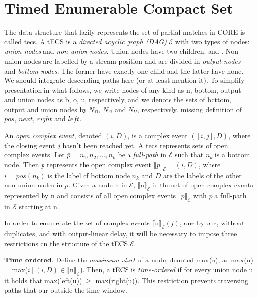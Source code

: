 \section{Timed Enumerable Compact Set}\label{sec:data_structure}

The data structure that lazily represents the set of partial matches in CORE is called \acrfull{tecs}. A tECS is a \emph{directed acyclic graph (DAG)} $\mathcal{E}$ with two types of nodes: \emph{union nodes} and \emph{non-union nodes}. Union nodes have two children:  and . Non-union nodes are labelled by a stream position and are divided in \emph{output nodes} and \emph{bottom nodes}. The former have exactly one child and the latter have none.
{\color{Comment} We should integrate descending-paths here (or at least mention it)}.
To simplify presentation in what follows, we write nodes of any kind as \textrm{n}, bottom, output and union nodes as \textrm{b, o, u}, respectively, and we denote the sets of bottom, output and union nodes by $N_{B}$, $N_{O}$ and $N_{U}$, respectively. {\color{Comment} missing definition of $pos$, $next$, $right$ and $left$}.

An \emph{open complex event}, denoted $(i, D)$, is a complex event $([i, j], D)$, where the closing event $j$ hasn't been reached yet. A \acrshort{tecs} represents sets of open complex events. Let $\bar{p} = n_{1}, n_{2}, \ldots, n_{k}$ be a \emph{full-path} in $\mathcal{E}$ such that $n_{k}$ is a bottom node. Then $\bar{p}$ represents the open complex event ${\llbracket \bar{p} \rrbracket}_{\mathcal{E}} = (i, D)$, where $i = pos(n_{k})$ is the label of bottom node $n_{k}$ and $D$ are the labels of the other non-union nodes in $\bar{p}$. Given a node \textrm{n} in $\mathcal{E}$, ${\llbracket \textrm{n} \rrbracket}_{\mathcal{E}}$ is the set of open complex events represented by \textrm{n} and consists of all open complex events ${\llbracket \bar{p} \rrbracket}_{\mathcal{E}}$ with $\bar{p}$ a full-path in $\mathcal{E}$ starting at \textrm{n}.

In order to enumerate the set of complex events ${\llbracket \textrm{n} \rrbracket}_{\mathcal{E}}(j)$, one by one, without duplicates, and with output-linear delay, it will be necessary to impose three restrictions on the structure of the tECS $\mathcal{E}$.

\textbf{Time-ordered}. Define the \emph{maximum-start} of a node, denoted max(\textrm{n}), as max(\textrm{n}) = max(${ i \ | \ (i, D) \in {\llbracket \textrm{n} \rrbracket}_{\mathcal{E}}}$). Then, a tECS is \emph{time-ordered} if for every union node \textrm{u} it holds that max(left(\textrm{u})) $\ge$ max(right(\textrm{u})). This restriction prevents traversing paths that our outside the time window.

